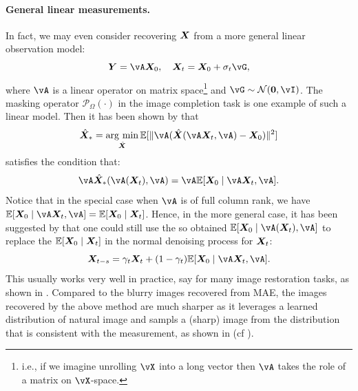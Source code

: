 \documentclass[../../book-main.tex]{subfiles}
\begin{document}
\paragraph{General linear measurements.} 
In fact, we may even consider recovering $\bm{X}$ from a more general linear observation model:
\begin{equation}
    \Y = \vA\X_0,  \quad \X_t = \X_0 + \sigma_t \vG,  
\end{equation}
where $\vA$ is a linear operator on matrix space\footnote{i.e., if we imagine unrolling \(\vX\) into a long vector then \(\vA\) takes the role of a matrix on \(\vX\)-space.} and $\vG \sim \mathcal{N}(\boldsymbol{0}, \vI)$. The masking operator $\mathcal{P}_{\Omega}(\cdot)$ in the image completion task is one example of such a linear model. Then it has been shown by \cite{daras2023ambient} that 
\begin{equation}
    \hat{\X}_* = \argmin_{\hat{\X}} \mathbb{E}[\|\vA(\hat{\X}(\vA\X_t, \vA) - \X_0)\|^2]
\end{equation}
satisfies the condition that:
\begin{equation}
    \vA \hat{\X}_*(\vA(\X_t), \vA) = \vA \mathbb{E}[\X_0 \mid \vA \X_t, \vA].
\end{equation} Notice that in the special case when $\vA$ is of  full column rank, we have $ \mathbb{E}[\X_0 \mid \vA\X_t, \vA] = \mathbb{E}[\X_0 \mid \X_t]$. Hence, in the more general case, it has been suggested by \cite{daras2023ambient} that one could still use the so obtained $\mathbb{E}[\X_0 \mid \vA(\X_t), \vA]$ to replace the $\mathbb{E}[\bm{X}_0 \mid \bm{X}_t]$ in the normal denoising process for $\bm{X}_t$:
\begin{equation}
    \X_{t-s} = \gamma_t \X_t + (1-\gamma_t) \mathbb{E}[\X_0 \mid \vA\X_t, \vA].
\end{equation}
This usually works very well in practice, say for many image restoration tasks, as shown in \cite{daras2023ambient}. Compared to the blurry images recovered from MAE, the images recovered by the above method are much sharper as it leverages a learned distribution of natural image and sampls a (sharp) image from the distribution that is consistent with the measurement, as shown in  (cf ).
\end{document}
